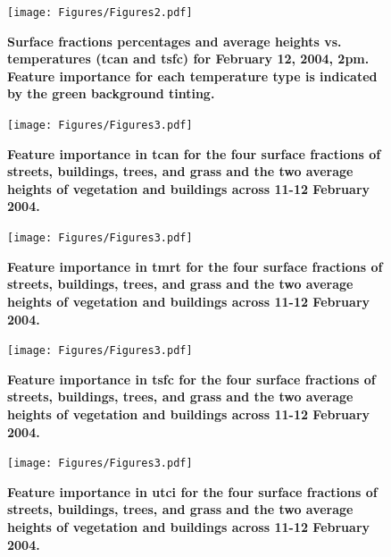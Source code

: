\documentclass[final,3p,times,authoryear]{elsarticle}
\begin{document}
\begin{figure}
\centering
\texttt{[image: Figures/Figures2.pdf]}
\caption{\bf Surface fractions percentages and average heights vs. temperatures (\gls{tcan} and \gls{tsfc}) for February 12, 2004, 2pm. Feature importance for each temperature type is indicated by the green background tinting.}
 \label{fig:box14a}
\end{figure} 



\begin{figure}
\centering
\texttt{[image: Figures/Figures3.pdf]}
\caption{\bf Feature importance in \gls{tcan} for the four surface fractions of streets, buildings, trees, and grass and the two average heights of vegetation and buildings across 11-12 February 2004. }
 \label{fig:featimpttcan}
\end{figure}

\begin{figure}
\centering
\texttt{[image: Figures/Figures3.pdf]}
\caption{\bf Feature importance in \gls{tmrt} for the four surface fractions of streets, buildings, trees, and grass and the two average heights of vegetation and buildings across 11-12 February 2004. }
 \label{fig:featimpttcan}
\end{figure}

\begin{figure}
\centering
\texttt{[image: Figures/Figures3.pdf]}
\caption{\bf Feature importance in \gls{tsfc} for the four surface fractions of streets, buildings, trees, and grass and the two average heights of vegetation and buildings across 11-12 February 2004. }
 \label{fig:featimpttcan}
\end{figure}

\begin{figure}
\centering
\texttt{[image: Figures/Figures3.pdf]}
\caption{\bf Feature importance in \gls{utci} for the four surface fractions of streets, buildings, trees, and grass and the two average heights of vegetation and buildings across 11-12 February 2004. }
 \label{fig:featimpttcan}
\end{figure}

\end{document}
